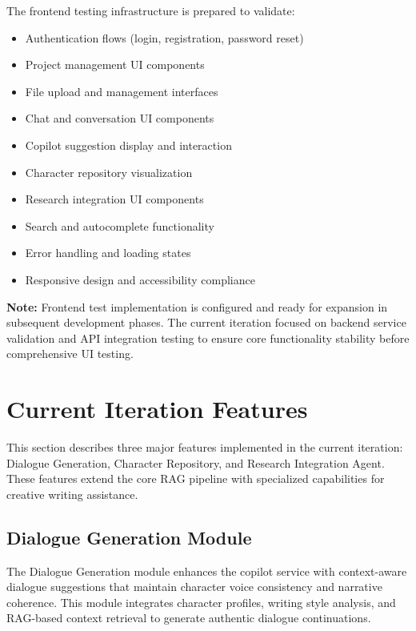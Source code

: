 The frontend testing infrastructure is prepared to validate:

\begin{itemize}
    \item Authentication flows (login, registration, password reset)
    \item Project management UI components
    \item File upload and management interfaces
    \item Chat and conversation UI components
    \item Copilot suggestion display and interaction
    \item Character repository visualization
    \item Research integration UI components
    \item Search and autocomplete functionality
    \item Error handling and loading states
    \item Responsive design and accessibility compliance
\end{itemize}

\textbf{Note:} Frontend test implementation is configured and ready for expansion in subsequent development phases. The current iteration focused on backend service validation and API integration testing to ensure core functionality stability before comprehensive UI testing.

\section{Current Iteration Features}
\label{sec:current-iteration-features}

This section describes three major features implemented in the current iteration: Dialogue Generation, Character Repository, and Research Integration Agent. These features extend the core RAG pipeline with specialized capabilities for creative writing assistance.

\subsection{Dialogue Generation Module}
\label{subsec:dialogue-generation}

The Dialogue Generation module enhances the copilot service with context-aware dialogue suggestions that maintain character voice consistency and narrative coherence. This module integrates character profiles, writing style analysis, and RAG-based context retrieval to generate authentic dialogue continuations.

